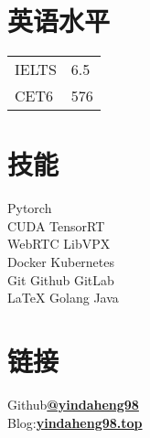 \documentclass[]{deedy-resume-openfont}
\begin{document}
\begin{minipage}[t]{0.21\textwidth}
	\section{英语水平}
	\begin{tabular}{ll}
		IELTS & 6.5 \\
		CET6  & 576 \\
	\end{tabular}
	\sectionsep

	\section{技能}
	Pytorch \\
	CUDA \textbullet{} TensorRT \\
	WebRTC \textbullet{} LibVPX \\
	Docker \textbullet{} Kubernetes \\
	Git \textbullet{} Github \textbullet{} GitLab \\
	\LaTeX \textbullet{} Golang \textbullet{} Java \\
	\sectionsep
    

	\section{链接}
	Github\href{https://github.com/yindaheng98}{\bf @yindaheng98} \\
	Blog:\href{http://www.yindaheng98.top}{\bf yindaheng98.top} \\
	\sectionsep


\end{minipage}
\hfill
\end{document}

